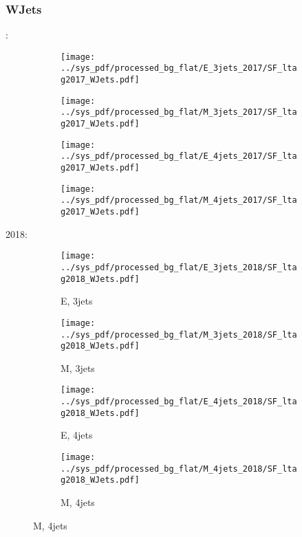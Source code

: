 \documentclass{beamer}
\begin{document}
\begin{frame}
\frametitle{WJets}
\fontsize{5}{1}:
\begin{figure}
\centering
\begin{subfigure}[b]{0.24\textwidth}
\texttt{[image: ../sys\_pdf/processed\_bg\_flat/E\_3jets\_2017/SF\_ltag2017\_WJets.pdf]}
\end{subfigure}
\begin{subfigure}[b]{0.24\textwidth}
\texttt{[image: ../sys\_pdf/processed\_bg\_flat/M\_3jets\_2017/SF\_ltag2017\_WJets.pdf]}
\end{subfigure}
\begin{subfigure}[b]{0.24\textwidth}
\texttt{[image: ../sys\_pdf/processed\_bg\_flat/E\_4jets\_2017/SF\_ltag2017\_WJets.pdf]}
\end{subfigure}
\begin{subfigure}[b]{0.24\textwidth}
\texttt{[image: ../sys\_pdf/processed\_bg\_flat/M\_4jets\_2017/SF\_ltag2017\_WJets.pdf]}
\end{subfigure}
\end{figure}
2018:
\begin{figure}
\centering
\begin{subfigure}[b]{0.24\textwidth}
\texttt{[image: ../sys\_pdf/processed\_bg\_flat/E\_3jets\_2018/SF\_ltag2018\_WJets.pdf]}
\captionsetup{font=tiny}
\caption{E, 3jets}
\end{subfigure}
\begin{subfigure}[b]{0.24\textwidth}
\texttt{[image: ../sys\_pdf/processed\_bg\_flat/M\_3jets\_2018/SF\_ltag2018\_WJets.pdf]}
\captionsetup{font=tiny}
\caption{M, 3jets}
\end{subfigure}
\begin{subfigure}[b]{0.24\textwidth}
\texttt{[image: ../sys\_pdf/processed\_bg\_flat/E\_4jets\_2018/SF\_ltag2018\_WJets.pdf]}
\captionsetup{font=tiny}
\caption{E, 4jets}
\end{subfigure}
\begin{subfigure}[b]{0.24\textwidth}
\texttt{[image: ../sys\_pdf/processed\_bg\_flat/M\_4jets\_2018/SF\_ltag2018\_WJets.pdf]}
\captionsetup{font=tiny}
\caption{M, 4jets}
\end{subfigure}
\end{figure}
\end{frame}
\end{document}
